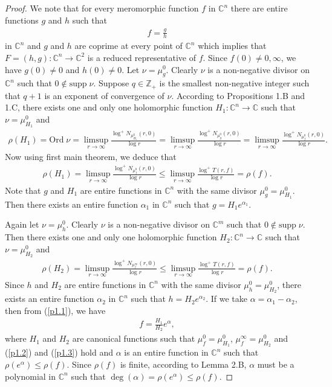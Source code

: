 \documentclass[11pt,reqno]{amsart}
\numberwithin{equation}{section}
\begin{document}
\begin{proof} We note that for every meromorphic function $f$ in $\mathbb{C}^n$ there are entire functions $g$ and 
$h$ such that 
\begin{align}\label{p1.1}
f=\frac{g}{h}
\end{align}
in $\mathbb{C}^n$ and $g$ and $h$ are coprime at every point of $\mathbb{C}^n$ \cite[pp. 186]{LH1} which implies 
that $F=(h,g):\mathbb{C}^n\to \mathbb{C}^2$ is a reduced representative of $f$. Since $f(0)\neq 0, \infty$, we have $g(0)\neq 0$ and $h(0)\neq 0$. Let $\nu=\mu^0_g$. Clearly $\nu$ is a non-negative divisor on $\mathbb{C}^n$ such that $0\not\in \text{supp}\;\nu$. Suppose $q\in\mathbb{Z}_+$ is the smallest non-negative integer such that $q+1$ is an exponent of convergence of $\nu$. According to Propositions 1.B and 1.C, there exists one and only one holomorphic function $H_1:\mathbb{C}^n\to \mathbb{C}$ such that $\nu=\mu^0_{H_1}$ and 
\begin{align*}
\rho(H_1)=\text{Ord}\;\nu=\limsup\limits_{r\to\infty} \frac{\log^+ N_{\mu^0_{H_1}}(r,0)}{\log r}=\limsup\limits_{r\to\infty} \frac{\log^+ N_{\mu^0_{g}}(r,0)}{\log r}=\limsup\limits_{r\to\infty} \frac{\log^+ N_{\mu^0_{f}}(r,0)}{\log r}.
\end{align*}
Now using first main theorem, we deduce that
\begin{align}\label{p1.2}
\rho(H_1)=\limsup\limits_{r\to\infty} \frac{\log^+ N_{\mu^0_{f}}(r,0)}{\log r}\leq \limsup\limits_{r\to\infty} \frac{\log^+ T(r,f)}{\log r}=\rho(f).
\end{align}
Note that $g$ and $H_1$ are entire functions in $\mathbb{C}^n$ with the same divisor $\mu^0_g=\mu^0_{H_1}$. Then there exists an entire function $\alpha_1$ in $\mathbb{C}^n$ such that $g=H_1e^{\alpha_1}$.

Again let $\nu=\mu^0_h$. Clearly $\nu$ is a non-negative divisor on $\mathbb{C}^m$ such that $0\not\in \text{supp}\;\nu$. Then there exists one and only one holomorphic function $H_2:\mathbb{C}^n\to \mathbb{C}$ such that $\nu=\mu^0_{H_2}$ and 
\begin{align}\label{p1.3}
\rho(H_2)=\limsup\limits_{r\to\infty} \frac{\log^+ N_{\mu^{\infty}_{f}}(r,0)}{\log r}\leq \limsup\limits_{r\to\infty} \frac{\log^+ T(r,f)}{\log r}=\rho(f).
\end{align}
Since $h$ and $H_2$ are entire functions in $\mathbb{C}^n$ with the same divisor $\mu^0_h=\mu^0_{H_2}$, there exists an entire function $\alpha_2$ in $\mathbb{C}^n$ such that $h=H_2e^{\alpha_2}$. If we take $\alpha=\alpha_1-\alpha_2$, then from (\ref{p1.1}), we have
\begin{align*}
f=\frac{H_1}{H_2}e^{\alpha},
\end{align*}
where $H_1$ and $H_2$ are canonical functions such that $\mu^0_f=\mu^0_{H_1}$, $\mu^{\infty}_f=\mu^0_{H_2}$ and (\ref{p1.2}) and (\ref{p1.3}) hold and $\alpha$ is an entire function in $\mathbb{C}^n$ such that $\rho(e^{\alpha})\leq \rho(f)$. Since $\rho(f)$ is finite, according to Lemma 2.B, $\alpha$ must be a polynomial in $\mathbb{C}^n$ such that $\deg(\alpha)=\rho(e^{\alpha})\leq \rho(f)$.
\end{proof}
\end{document}
